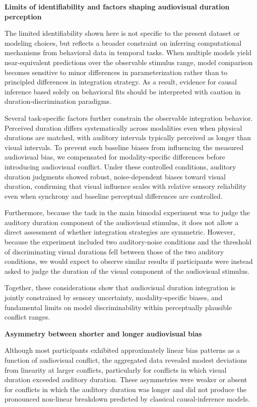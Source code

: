 \documentclass[9pt,lineno,doublespacing]{elife}
\begin{document}
\textbf{Limits of identifiability and factors shaping audiovisual duration perception}

The limited identifiability shown here is not specific to the present dataset or modeling choices, but reflects a broader constraint on inferring computational mechanisms from behavioral data in temporal tasks. When multiple models yield near-equivalent predictions over the observable stimulus range, model comparison becomes sensitive to minor differences in parameterization rather than to principled differences in integration strategy. As a result, evidence for causal inference based solely on behavioral fits should be interpreted with caution in duration-discrimination paradigms.

Several task-specific factors further constrain the observable integration behavior. Perceived duration differs systematically across modalities even when physical durations are matched, with auditory intervals typically perceived as longer than visual intervals. To prevent such baseline biases from influencing the measured audiovisual bias, we compensated for modality-specific differences before introducing audiovisual conflict. Under these controlled conditions, auditory duration judgments showed robust, noise-dependent biases toward visual duration, confirming that visual influence scales with relative sensory reliability even when synchrony and baseline perceptual differences are controlled.

Furthermore, because the task in the main bimodal experiment was to judge the auditory duration component of the audiovisual stimulus, it does not allow a direct assessment of whether integration strategies are symmetric. However, because the experiment included two auditory-noise conditions and the threshold of discriminating visual durations fell between those of the two auditory conditions, we would expect to observe similar results if participants were instead asked to judge the duration of the visual component of the audiovisual stimulus.

Together, these considerations show that audiovisual duration integration is jointly constrained by sensory uncertainty, modality-specific biases, and fundamental limits on model discriminability within perceptually plausible conflict ranges.

\textbf{Asymmetry between shorter and longer audiovisual bias}

Although most participants exhibited approximately linear bias patterns as a function of audiovisual conflict, the aggregated data revealed modest deviations from linearity at larger conflicts, particularly for conflicts in which visual duration exceeded auditory duration. These asymmetries were weaker or absent for conflicts in which the auditory duration was longer and did not produce the pronounced non-linear breakdown predicted by classical causal-inference models.
\end{document}
